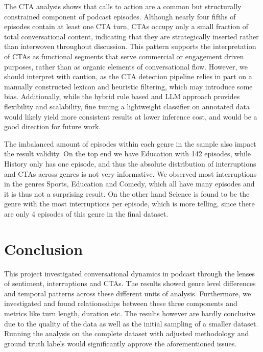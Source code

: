 \documentclass{article}
\begin{document}
The CTA analysis shows that calls to action are a common but structurally constrained component of podcast episodes. Although nearly four fifths of episodes contain at least one CTA turn, CTAs occupy only a small fraction of total conversational content, indicating that they are strategically inserted rather than interwoven throughout discussion. This pattern supports the interpretation of CTAs as functional segments that serve commercial or engagement driven purposes, rather than as organic elements of conversational flow. However, we should interpret with caution, as the CTA detection pipeline relies in part on a manually constructed lexicon and heuristic filtering, which may introduce some bias. Additionally, while the hybrid rule based and LLM approach provides flexibility and scalability, fine tuning a lightweight classifier on annotated data would likely yield more consistent results at lower inference cost, and would be a good direction for future work.

The imbalanced amount of episodes within each genre in the sample also impact the result validity. On the top end we have Education with 142 episodes, while History only has one episode, and thus the absolute distribution of interruptions and CTAs across genres is not very informative. We observed most interruptions in the genres Sports, Education and Comedy, which all have many episodes and it is thus not a surprising result. On the other hand Science is found to be the genre with the most interruptions per episode, which is more telling, since there are only 4 episodes of this genre in the final dataset. 

\section{Conclusion}
This project investigated conversational dynamics in podcast through the lenses of sentiment, interruptions and CTAs. The results showed genre level differences and temporal patterns across these different units of analysis. Furthermore, we investigated and found relationsships between these three components and metrics like turn length, duration etc. The results however are hardly conclusive due to the quality of the data as well as the initial sampling of a smaller dataset. Running the analysis on the complete dataset with adjusted methodology and ground truth labels would significantly approve the aforementioned issues.

\newpage

\end{document}
